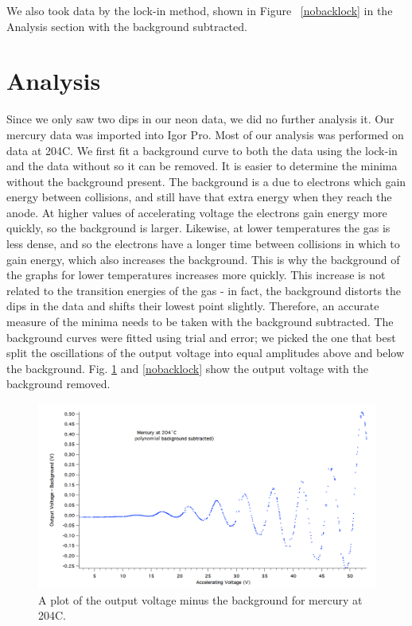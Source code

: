 \documentclass[prb,preprint]{revtex4-1}
\begin{document}
We also took data by the lock-in method, shown in Figure ~\ref{nobacklock} in the Analysis section with the background subtracted. 

\section{Analysis}
Since we only saw two dips in our neon data, we did no further analysis it. Our mercury data was imported into Igor Pro. Most of our analysis was performed on data at 204\degree C. 
We first fit a background curve to both the data using the lock-in and the data without so it can be removed.
It is easier to determine the minima without the background present.
The background is a due to electrons which gain energy between collisions, and still have that extra energy when they reach the anode. At higher values of accelerating voltage the electrons gain energy more quickly, so the background is larger.  Likewise, at lower temperatures the gas is less dense, and so the electrons have a longer time between collisions in which to gain energy, which also increases the background.  This is why the background of the graphs for lower temperatures increases more quickly. This increase is not related to the transition energies of the gas - in fact, the background distorts the dips in the data and shifts their lowest point slightly.  Therefore, an accurate measure of the minima needs to be taken with the background subtracted. 
The background curves were fitted using trial and error; we picked the one that best split the oscillations of the output voltage into equal amplitudes above and below the background. 
Fig. \ref{nobacknolock} and \ref{nobacklock} show the output voltage with the background removed. 

\begin{figure}[h!] %
\centering
\includegraphics[width=6in]{204C_noback.png}
\caption{A plot of the output voltage minus the background for mercury at 204\degree C.}
\label{nobacknolock}
\end{figure}
\end{document}
